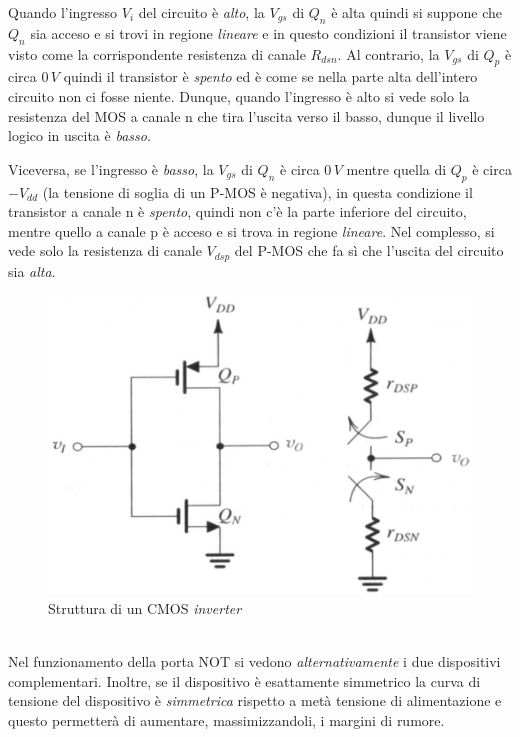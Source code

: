 \documentclass[12pt, a4paper]{report}
\begin{document}
Quando l'ingresso $V_{i}$ del circuito è \textit{alto}, la $V_{gs}$ di $Q_n$ è alta quindi si suppone che $Q_n$ sia acceso e si trovi in regione \textit{lineare} e in questo condizioni il transistor viene visto come la corrispondente resistenza di canale $R_{dsn}$. Al contrario, la $V_{gs}$ di $Q_p$ è circa $0\,V$ quindi il transistor è \textit{spento} ed è come se nella parte alta dell'intero circuito non ci fosse niente. Dunque, quando l'ingresso è alto si vede solo la resistenza del MOS a canale n che tira l'uscita verso il basso, dunque il livello logico in uscita è \textit{basso}.

Viceversa, se l'ingresso è \textit{basso}, la $V_{gs}$ di $Q_n$ è circa $0\,V$ mentre quella di $Q_p$ è circa $-V_{dd}$ (la tensione di soglia di un P-MOS è negativa), in questa condizione il transistor a canale n è \textit{spento}, quindi non c'è la parte inferiore del circuito, mentre quello a canale p è acceso e si trova in regione \textit{lineare}. Nel complesso, si vede solo la resistenza di canale $V_{dsp}$ del P-MOS che fa sì che l'uscita del circuito sia \textit{alta}.
\begin{figure}[h]
    \centering
    \includegraphics[scale=0.4,angle=0]{cmos.png}
    \caption{Struttura di un CMOS \textit{inverter}}
    \label{cmos}
\end{figure}
\\Nel funzionamento della porta NOT si vedono \textit{alternativamente} i due dispositivi complementari. Inoltre, se il dispositivo è esattamente simmetrico la curva di tensione del dispositivo è \textit{simmetrica} rispetto a metà tensione di alimentazione e questo permetterà di aumentare, massimizzandoli, i margini di rumore.
\end{document}
